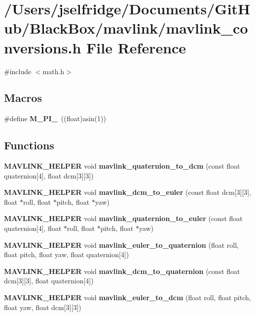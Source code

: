 \section{/\+Users/jselfridge/\+Documents/\+Git\+Hub/\+Black\+Box/mavlink/mavlink\+\_\+conversions.h File Reference}
\label{mavlink__conversions_8h}
{\ttfamily \#include $<$math.\+h$>$}\newline
\subsection*{Macros}
\begin{DoxyCompactItemize}
\item 
\#define \textbf{ M\+\_\+\+P\+I\+\_}~((float)asin(1))
\end{DoxyCompactItemize}
\subsection*{Functions}
\begin{DoxyCompactItemize}
\item 
\textbf{ M\+A\+V\+L\+I\+N\+K\+\_\+\+H\+E\+L\+P\+ER} void \textbf{ mavlink\+\_\+quaternion\+\_\+to\+\_\+dcm} (const float quaternion[4], float dcm[3][3])
\item 
\textbf{ M\+A\+V\+L\+I\+N\+K\+\_\+\+H\+E\+L\+P\+ER} void \textbf{ mavlink\+\_\+dcm\+\_\+to\+\_\+euler} (const float dcm[3][3], float $\ast$roll, float $\ast$pitch, float $\ast$yaw)
\item 
\textbf{ M\+A\+V\+L\+I\+N\+K\+\_\+\+H\+E\+L\+P\+ER} void \textbf{ mavlink\+\_\+quaternion\+\_\+to\+\_\+euler} (const float quaternion[4], float $\ast$roll, float $\ast$pitch, float $\ast$yaw)
\item 
\textbf{ M\+A\+V\+L\+I\+N\+K\+\_\+\+H\+E\+L\+P\+ER} void \textbf{ mavlink\+\_\+euler\+\_\+to\+\_\+quaternion} (float roll, float pitch, float yaw, float quaternion[4])
\item 
\textbf{ M\+A\+V\+L\+I\+N\+K\+\_\+\+H\+E\+L\+P\+ER} void \textbf{ mavlink\+\_\+dcm\+\_\+to\+\_\+quaternion} (const float dcm[3][3], float quaternion[4])
\item 
\textbf{ M\+A\+V\+L\+I\+N\+K\+\_\+\+H\+E\+L\+P\+ER} void \textbf{ mavlink\+\_\+euler\+\_\+to\+\_\+dcm} (float roll, float pitch, float yaw, float dcm[3][3])
\end{DoxyCompactItemize}


